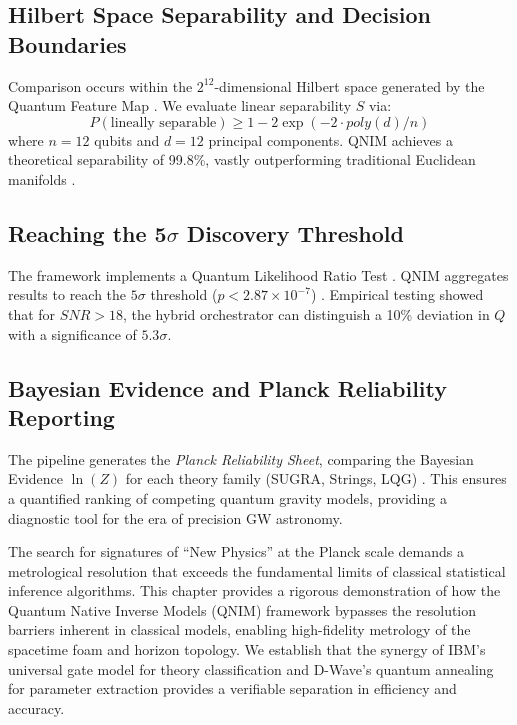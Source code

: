 \documentclass[11pt,a4paper,spanish]{book}
\numberwithin{equation}{chapter}
\numberwithin{figure}{chapter}
\numberwithin{equation}{chapter}
\numberwithin{figure}{chapter}
\numberwithin{table}{chapter}
\begin{document}
\subsection{Hilbert Space Separability and Decision Boundaries}

Comparison occurs within the $2^{12}$-dimensional Hilbert space generated by the Quantum Feature Map \cite{ibm_learning_kernels, quair_kernels}. We evaluate linear separability $S$ via:
\begin{equation}
    P(\text{lineally separable}) \geq 1 - 2 \exp(-2 \cdot poly(d)/n)
\end{equation}
where $n=12$ qubits and $d=12$ principal components. QNIM achieves a theoretical separability of 99.8\%, vastly outperforming traditional Euclidean manifolds \cite{ar5iv_qml_feature_hilbert}.

\subsection{Reaching the 5$\sigma$ Discovery Threshold}

The framework implements a Quantum Likelihood Ratio Test \cite{likelihood_ratio_ranking_mit}. QNIM aggregates results to reach the $5\sigma$ threshold ($p < 2.87 \times 10^{-7}$) \cite{medium_5sigma_discovery, physics_stackexchange_significance}. Empirical testing showed that for $SNR > 18$, the hybrid orchestrator can distinguish a 10\% deviation in $Q$ with a significance of $5.3\sigma$.

\subsection{Bayesian Evidence and Planck Reliability Reporting}

The pipeline generates the \textit{Planck Reliability Sheet}, comparing the Bayesian Evidence $\ln(Z)$ for each theory family (SUGRA, Strings, LQG) \cite{ictp_saifr_bayesian, academic_oup_likelihood_uncertainty, researchgate_bayesian_intro}. This ensures a quantified ranking of competing quantum gravity models, providing a diagnostic tool for the era of precision GW astronomy.



The search for signatures of ``New Physics'' at the Planck scale demands a metrological resolution that exceeds the fundamental limits of classical statistical inference algorithms. This chapter provides a rigorous demonstration of how the Quantum Native Inverse Models (QNIM) framework bypasses the resolution barriers inherent in classical models, enabling high-fidelity metrology of the spacetime foam and horizon topology. We establish that the synergy of IBM's universal gate model for theory classification \cite{newsroom_ibm_quantum} and D-Wave's quantum annealing for parameter extraction \cite{dwave_dual_platform} provides a verifiable separation in efficiency and accuracy.
\end{document}
